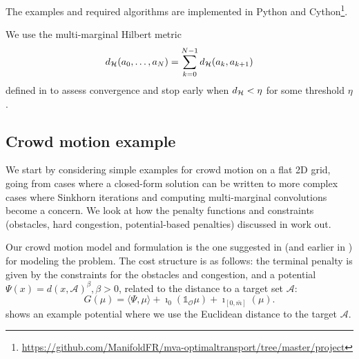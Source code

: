 \documentclass[../report.tex]{subfiles}
\begin{document}
The examples and required algorithms are implemented in Python and Cython\footnote{\url{https://github.com/ManifoldFR/mva-optimaltransport/tree/master/project}}.

We use the multi-marginal Hilbert metric 
\begin{equation}
	d_{\mathcal{H}}(a_0,\ldots,a_N) =
	\sum_{k=0}^{N-1} d_{\mathcal{H}}(a_k, a_{k+1})
\end{equation}
defined in \textcite[p.~16]{benamou2017generalizedIncompressible} to assess convergence and stop early when $d_{\mathcal{H}} < \eta$ for some threshold $\eta$.

\subsection{Crowd motion example}

We start by considering simple examples for crowd motion on a flat 2D grid, going from cases where a closed-form solution can be written to more complex cases where Sinkhorn iterations and computing multi-marginal convolutions become a concern. We look at how the penalty functions and constraints (obstacles, hard congestion, potential-based penalties) discussed in \textcite{benamou:hal-01295299} work out.

Our crowd motion model and formulation is the one suggested in \textcite{benamou:hal-01295299} (and earlier in \textcite{peyr2015entropic}) for modeling the problem. The cost structure is as follows: the terminal penalty is given by the constraints for the obstacles and congestion, and a potential $\Psi(x) = d(x, \mathscr A)^{\beta}, \beta > 0$, related to the distance to a target set $\mathscr{A}$:
\[
	G(\mu) = \langle \Psi, \mu\rangle + \imath_{0}(\mathds{1}_{\mathscr O}\mu)
	+ \imath_{[0,\bar{m}]}(\mu).
\]
 shows an example potential where we use the Euclidean distance to the target $\mathscr{A}$.
\end{document}
